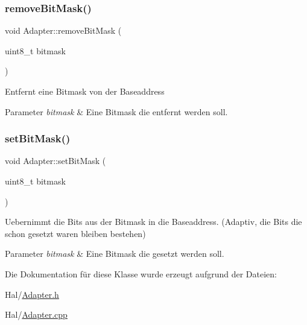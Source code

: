 \subsubsection{\texorpdfstring{remove\+Bit\+Mask()}{removeBitMask()}}
{\footnotesize\ttfamily void Adapter\+::remove\+Bit\+Mask (\begin{DoxyParamCaption}\item[{uint8\+\_\+t}]{bitmask }\end{DoxyParamCaption})}

Entfernt eine Bitmask von der Baseaddress


\begin{DoxyParams}{Parameter}
{\em bitmask} & Eine Bitmask die entfernt werden soll. \\
\hline
\end{DoxyParams}
\hypertarget{class_adapter_adff950a92be7f52dbe08ff3af766a562}{}\label{class_adapter_adff950a92be7f52dbe08ff3af766a562} 
\subsubsection{\texorpdfstring{set\+Bit\+Mask()}{setBitMask()}}
{\footnotesize\ttfamily void Adapter\+::set\+Bit\+Mask (\begin{DoxyParamCaption}\item[{uint8\+\_\+t}]{bitmask }\end{DoxyParamCaption})}

Uebernimmt die Bits aus der Bitmask in die Baseaddress. (Adaptiv, die Bits die schon gesetzt waren bleiben bestehen)


\begin{DoxyParams}{Parameter}
{\em bitmask} & Eine Bitmask die gesetzt werden soll. \\
\hline
\end{DoxyParams}


Die Dokumentation für diese Klasse wurde erzeugt aufgrund der Dateien\+:\begin{DoxyCompactItemize}
\item 
Hal/\hyperlink{_adapter_8h}{Adapter.\+h}\item 
Hal/\hyperlink{_adapter_8cpp}{Adapter.\+cpp}\end{DoxyCompactItemize}
